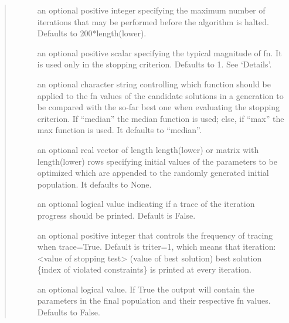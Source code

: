\documentclass[letterpaper,10pt,english]{sphinxmanual}
\begin{document}
\begin{fulllineitems}
\begin{quote}
\begin{description}
\begin{description}
\item[{}] \leavevmode
an optional positive integer specifying the maximum number of iterations
that may be performed before the algorithm is halted. Defaults to
200*length(lower).

\item[{}] \leavevmode
an optional positive scalar specifying the typical magnitude of fn.
It is used only in the stopping criterion. Defaults to 1. See ‘Details’.

\item[{}] \leavevmode
an optional character string controlling which function should be
applied to the fn values of the candidate solutions in a generation to
be compared with the so-far best one when evaluating the stopping
criterion. If “median” the median function is used; else, if “max” the
max function is used. It defaults to “median”.

\item[{}] \leavevmode
an optional real vector of length length(lower) or matrix with
length(lower) rows specifying initial values of the parameters to be
optimized which are appended to the randomly generated initial
population. It defaults to None.

\item[{}] \leavevmode
an optional logical value indicating if a trace of the iteration
progress should be printed. Default is False.

\item[{}] \leavevmode
an optional positive integer that controls the frequency of tracing when
trace=True. Default is triter=1, which means that iteration: \textless{}value of
stopping test\textgreater{} (value of best solution) best solution \{index of
violated constraints\} is printed at every iteration.

\item[{}] \leavevmode
an optional logical value. If True the output will contain the
parameters in the final population and their respective fn values.
Defaults to False.

\end{description}

\end{description}\end{quote}

\end{fulllineitems}
\end{document}

